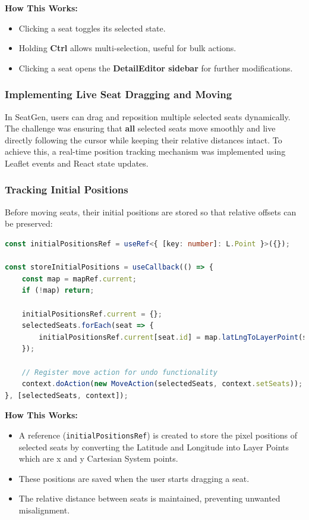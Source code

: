 \textbf{How This Works:}
\begin{itemize}
    \item Clicking a seat toggles its selected state.
    \item Holding \textbf{Ctrl} allows multi-selection, useful for bulk actions.
    \item Clicking a seat opens the \textbf{DetailEditor sidebar} for further modifications.
\end{itemize}


\subsubsection{Implementing Live Seat Dragging and Moving}

In SeatGen, users can drag and reposition multiple selected seats dynamically. The challenge was ensuring that \textbf{all} selected seats move smoothly and live directly following the cursor while keeping their relative distances intact. To achieve this, a real-time position tracking mechanism was implemented using Leaflet events and React state updates.

\subsubsection{Tracking Initial Positions}
Before moving seats, their initial positions are stored so that relative offsets can be preserved:

\begin{lstlisting}[language=TypeScript, caption=Storing Initial Positions Before Dragging, label=lst:seat-initial-pos]
const initialPositionsRef = useRef<{ [key: number]: L.Point }>({});

const storeInitialPositions = useCallback(() => {
    const map = mapRef.current;
    if (!map) return;

    initialPositionsRef.current = {};
    selectedSeats.forEach(seat => {
        initialPositionsRef.current[seat.id] = map.latLngToLayerPoint(seat.position);
    });

    // Register move action for undo functionality
    context.doAction(new MoveAction(selectedSeats, context.setSeats));
}, [selectedSeats, context]);
\end{lstlisting}

\textbf{How This Works:}
\begin{itemize}
    \item A reference (\texttt{initialPositionsRef}) is created to store the pixel positions of selected seats by converting the Latitude and Longitude into Layer Points which are x and y Cartesian System points.
    \item These positions are saved when the user starts dragging a seat.
    \item The relative distance between seats is maintained, preventing unwanted misalignment.
\end{itemize}

